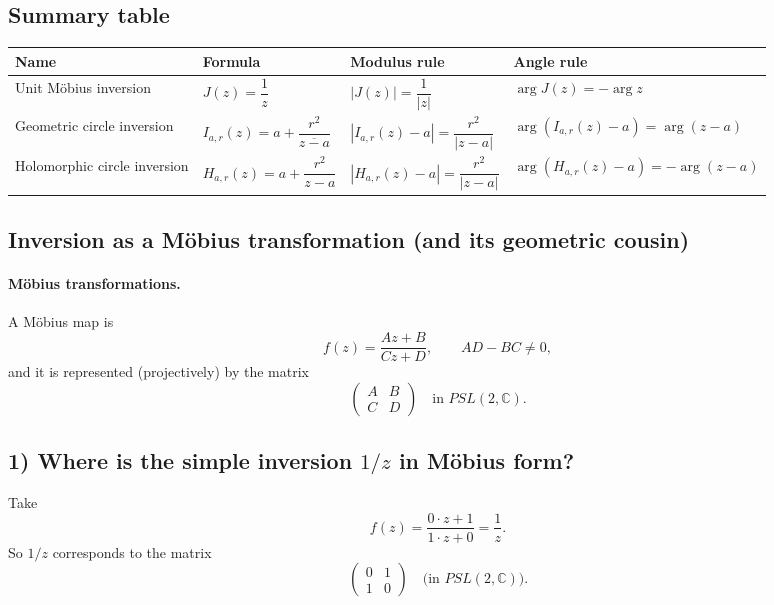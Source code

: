 \documentclass[12pt,a4paper]{article}
\newcommand{\C}{\mathbb{C}}
\theoremstyle{plain}
\theoremstyle{definition}      %
\begin{document}

\subsection*{\textbf{Summary table}}

\begin{center}
	\renewcommand{\arraystretch}{1.25}
	\begin{tabular}{|l|l|l|l|}
		\hline
		\textbf{Name} & \textbf{Formula} & \textbf{Modulus rule} & \textbf{Angle rule} \\
		\hline
		Unit Möbius inversion & $J(z)=\dfrac1z$ &
		$\left|J(z)\right|=\dfrac{1}{|z|}$ &
		$\arg J(z)= -\arg z$ \\
		\hline
		Geometric circle inversion & $I_{a,r}(z)=a+\dfrac{r^2}{\overline{z-a}}$ &
		$\left|I_{a,r}(z)-a\right|=\dfrac{r^2}{|z-a|}$ &
		$\arg(I_{a,r}(z)-a)=\arg(z-a)$ \\
		\hline
		Holomorphic circle inversion & $H_{a,r}(z)=a+\dfrac{r^2}{z-a}$ &
		$\left|H_{a,r}(z)-a\right|=\dfrac{r^2}{|z-a|}$ &
		$\arg(H_{a,r}(z)-a)= -\arg(z-a)$ \\
		\hline
	\end{tabular}
\end{center}

	
	\subsection*{\textbf{Inversion as a Möbius transformation (and its geometric cousin)}}
	
	\paragraph{\textbf{Möbius transformations.}}
	A Möbius map is
	\[
	f(z)=\frac{Az+B}{Cz+D},\qquad AD-BC\neq 0,
	\]
	and it is represented (projectively) by the matrix
	\[
	\begin{pmatrix}A & B\\ C & D\end{pmatrix}
	\quad\text{in } PSL(2,\C).
	\]
	
	\subsection*{\textbf{1) Where is the simple inversion $1/z$ in Möbius form?}}
	Take
	\[
	f(z)=\frac{0\cdot z+1}{1\cdot z+0}=\frac{1}{z}.
	\]
	So $1/z$ corresponds to the matrix
	\[
	\begin{pmatrix}0 & 1\\ 1 & 0\end{pmatrix}
	\quad\text{(in } PSL(2,\C)\text{).}
	\]
	
\end{document}
